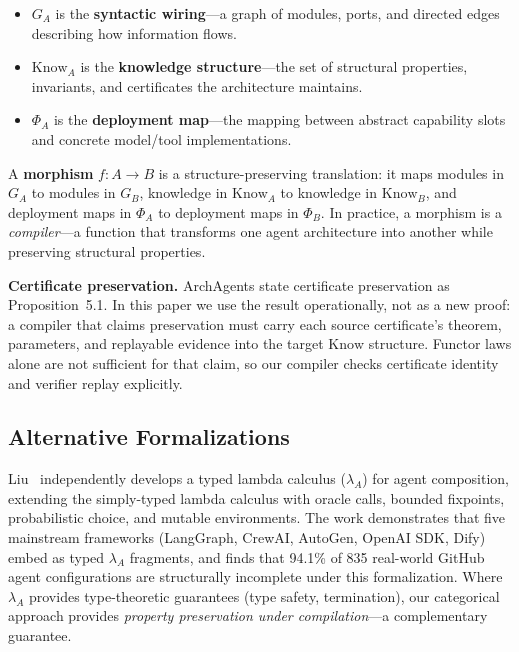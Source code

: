 \begin{itemize}[leftmargin=*]
\item $G_A$ is the \textbf{syntactic wiring}---a graph of modules, ports, and directed edges describing how information flows.
\item $\mathrm{Know}_A$ is the \textbf{knowledge structure}---the set of structural properties, invariants, and certificates the architecture maintains.
\item $\Phi_A$ is the \textbf{deployment map}---the mapping between abstract capability slots and concrete model/tool implementations.
\end{itemize}

A \textbf{morphism} $f: A \to B$ is a structure-preserving translation: it maps modules in $G_A$ to modules in $G_B$, knowledge in $\mathrm{Know}_A$ to knowledge in $\mathrm{Know}_B$, and deployment maps in $\Phi_A$ to deployment maps in $\Phi_B$. In practice, a morphism is a \emph{compiler}---a function that transforms one agent architecture into another while preserving structural properties.

\textbf{Certificate preservation.} ArchAgents state certificate preservation as Proposition~5.1. In this paper we use the result operationally, not as a new proof: a compiler that claims preservation must carry each source certificate's theorem, parameters, and replayable evidence into the target $\mathrm{Know}$ structure. Functor laws alone are not sufficient for that claim, so our compiler checks certificate identity and verifier replay explicitly.

\subsection{Alternative Formalizations}

Liu~\cite{liu2026lambda} independently develops a typed lambda calculus ($\lambda_A$) for agent composition, extending the simply-typed lambda calculus with oracle calls, bounded fixpoints, probabilistic choice, and mutable environments. The work demonstrates that five mainstream frameworks (LangGraph, CrewAI, AutoGen, OpenAI SDK, Dify) embed as typed $\lambda_A$ fragments, and finds that 94.1\% of 835 real-world GitHub agent configurations are structurally incomplete under this formalization. Where $\lambda_A$ provides type-theoretic guarantees (type safety, termination), our categorical approach provides \emph{property preservation under compilation}---a complementary guarantee.

